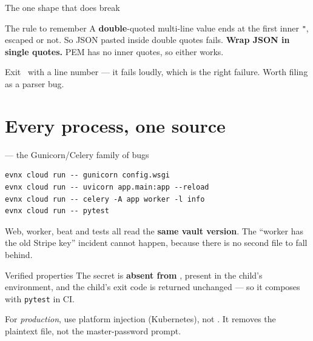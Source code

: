 \documentclass[aspectratio=169,10pt]{beamer}
\begin{document}
\begin{frame}[fragile]{The one shape that does break}

  \vspace{0.4em}
  \begin{trap}{The rule to remember}
    A \textbf{double}-quoted multi-line value ends at the first inner
    \texttt{"}, escaped or not. So JSON pasted inside double quotes fails.
    \textbf{Wrap JSON in single quotes.} PEM has no inner quotes, so either
    works.
  \end{trap}

  \vspace{0.3em}
  {\footnotesize Exit \exittwo\ with a line number --- it fails loudly, which
  is the right failure. Worth filing as a parser bug.}
\end{frame}

\section{Every process, one source}

\begin{frame}[fragile]{ --- the Gunicorn/Celery family of bugs}
\begin{lstlisting}[style=evnxcode]
evnx cloud run -- gunicorn config.wsgi
evnx cloud run -- uvicorn app.main:app --reload
evnx cloud run -- celery -A app worker -l info
evnx cloud run -- pytest
\end{lstlisting}

  \vspace{0.6em}
  Web, worker, beat and tests all read the \textbf{same vault version}. The
  ``worker has the old Stripe key'' incident cannot happen, because there is no
  second file to fall behind.

  \vspace{0.8em}
  \begin{block}{Verified properties}
    The secret is \textbf{absent from} , present in the
    child's environment, and the child's exit code is returned unchanged ---
    so it composes with \texttt{pytest} in CI.
  \end{block}

  \vspace{0.4em}
  {\footnotesize For \emph{production}, use platform injection (Kubernetes),
  not . It removes the plaintext file, not the master-password
  prompt.}
\end{frame}
\end{document}
